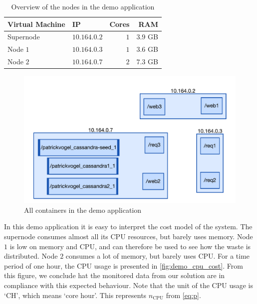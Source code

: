 \begin{table}[hbt!]
    \centering
    \begin{tabular}{l|lrr}
        Virtual Machine &IP & Cores & RAM \\ \hline
        Supernode & $10.164.0.2$ & $1$ & $3.9$ GB \\
        Node $1$ & $10.164.0.3$ & $1$ & $3.6$ GB \\
        Node $2$ & $10.164.0.7$ & $2$ & $7.3$ GB \\
    \end{tabular}
    \caption{Overview of the nodes in the demo application}
    \label{tab:node_stats}
\end{table}

\begin{figure}[hbt!]
    \centering
    \includegraphics[width=\textwidth]{gfx/demo_app}
    \caption{All containers in the demo application}
    \label{fig:demo_app}
\end{figure}

\noindent
In this demo application it is easy to interpret the cost model of the system. The supernode consumes almost all its CPU resources, but barely uses memory. Node $1$ is low on memory and CPU, and can therefore be used to see how the waste is distributed. Node $2$ consumes a lot of memory, but barely uses CPU. For a time period of one hour, the CPU usage is presented in \autoref{fig:demo_cpu_cost}. From this figure, we conclude hat the monitored data from our solution are in compliance with this expected behaviour. Note that the unit of the CPU usage is `CH', which means `core hour'. This represents $n_\text{CPU}$ from \autoref{eq:p}.\\

